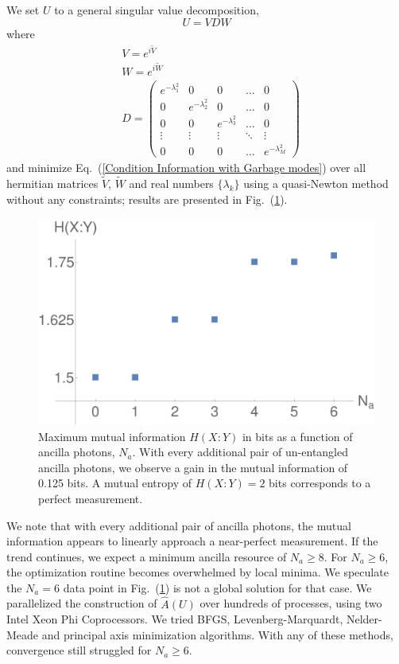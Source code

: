 \documentclass[aps,pra,twocolumn,showpacs,superscriptaddress,floatfix,10pt]{revtex4}
\begin{document}
We set $U$ to a general singular value decomposition,
\begin{equation}
	\label{Singular Value Decomposition}
	U = V D W
\end{equation}
where
\begin{eqnarray}
	& V = e^{i \tilde{V}} \\
	& W = e^{i \tilde{W}} \\
	& D =  \begin{pmatrix} e^{-\lambda^2_1} & 0 & 0 & \hdots & 0 \\ 0 & e^{-\lambda^2_2} & 0 & \hdots & 0 \\ 0 & 0 & e^{-\lambda^2_3} & \hdots & 0 \\ \vdots
	& \vdots & \vdots & \ddots & \vdots \\
	0 & 0 & 0 & \hdots & e^{-\lambda^2_M} \end{pmatrix} 
\end{eqnarray}
and minimize Eq.~(\ref{Condition Information with Garbage modes}) over all hermitian matrices $\tilde{V}$, $\tilde{W}$ and real numbers $\{\lambda_k\}$ using a quasi-Newton method without any constraints; results are presented in Fig.~(\ref{Mutual Information Results}).
\begin{figure}[ht]
	\centering
	\includegraphics[width= 0.48 \textwidth]{./EntropyData.pdf}
	\caption{ Maximum mutual information $H(X:Y)$ in bits as a function of ancilla photons, $N_a$. With every additional pair of un-entangled ancilla photons, we observe a gain in the mutual information of 0.125 bits. A mutual entropy of $H(X:Y) = 2$ bits corresponds to a perfect measurement.}
	\label{Mutual Information Results}
\end{figure}
We note that with every additional pair of ancilla photons, the mutual information appears to linearly approach a near-perfect measurement. If the trend continues, we expect a minimum ancilla resource of $N_a \ge 8$. For $N_a \ge 6$, the optimization routine becomes overwhelmed by local minima. We speculate the $N_a=6$ data point in Fig.~(\ref{Mutual Information Results}) is not a global solution for that case. We parallelized the construction of $\hat{A}(U)$ over hundreds of processes, using two Intel Xeon Phi Coprocessors. We tried BFGS, Levenberg-Marquardt, Nelder-Meade and principal axis minimization algorithms. With any of these methods, convergence still struggled for $N_a \ge 6$.
\end{document}
